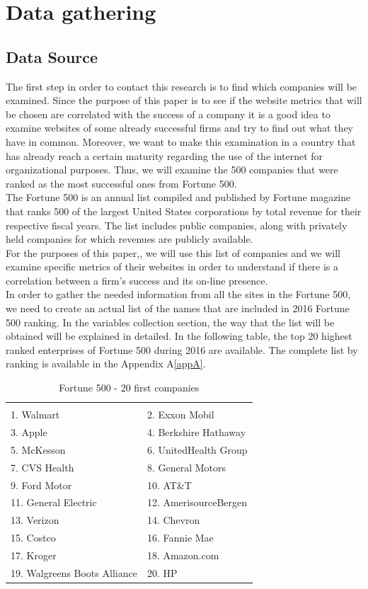 \documentclass{book}
\begin{document}
\newpage
\chapter{Data gathering}

\section{Data Source}\label{ds:f500}
The first step in order to contact this research is to find which companies will be examined. Since the purpose of this paper is to see if the website metrics that will be chosen are correlated with the success of a company it is a good idea to examine websites of some already successful firms and try to find out what they have in common. Moreover, we want to make this examination in a country that has already reach a certain maturity regarding the use of the internet for organizational purposes. Thus, we will examine the 500 companies that were ranked as the most successful ones from Fortune 500.\\
The Fortune 500 is an annual list compiled and published by Fortune magazine that ranks 500 of the largest United States corporations by total revenue for their respective fiscal years. The list includes public companies, along with privately held companies for which revenues are publicly available.\cite{key1, key2}\\
For the purposes of this paper,, we will use this list of companies and we will examine specific metrics of their websites in order to understand if there is a correlation between a firm's success and its on-line presence.\\
In order to gather the needed information from all the sites in the Fortune 500, we need to create an actual list of the names that are included in 2016 Fortune 500 ranking. In the variables collection section, the way that the list will be obtained will be explained in detailed. In the following table, the top 20 highest ranked enterprises of Fortune 500 during 2016 are available. The complete list by ranking is available in the Appendix A\ref{appA}.
\begin{table}[H]
\centering
\caption{Fortune 500 - 20 first companies}
\begin{tabular}{ll}
\hline
 \\ 1. Walmart 
&  2. Exxon Mobil 
\\  3. Apple 
& 4. Berkshire Hathaway 
\\  5. McKesson 
&  6. UnitedHealth Group 
\\ 7. CVS Health 
&  8. General Motors 
\\  9. Ford Motor 
& 10. AT\&T 
\\  11. General Electric 
&  12. AmerisourceBergen 
\\ 13. Verizon 
&  14. Chevron 
\\ 15. Costco 
& 16. Fannie Mae 
\\  17. Kroger 
&  18. Amazon.com 
\\ 19. Walgreens Boots Alliance 
&  20. HP 
 \\ \hline
\end{tabular}
\end{table}
\end{document}
